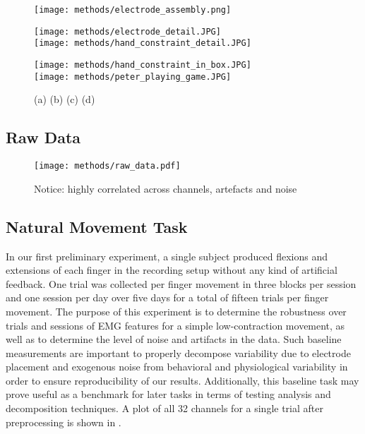 \documentclass[../main.tex]{subfiles}
\begin{document}
\begin{figure}
  \centering
  \begin{minipage}{0.33\textwidth}
    \texttt{[image: methods/electrode\_assembly.png]}
    \subcaption{}
  \end{minipage}%
  \hspace*{5pt}
  \begin{minipage}{0.33\textwidth}
    \texttt{[image: methods/electrode\_detail.JPG]}\\
    \subcaption{}
    \texttt{[image: methods/hand\_constraint\_detail.JPG]}
    \subcaption{}
  \end{minipage}%
  \hspace*{5pt}
  \begin{minipage}{0.33\textwidth}
    \texttt{[image: methods/hand\_constraint\_in\_box.JPG]}\\
    \subcaption{}
    \texttt{[image: methods/peter\_playing\_game.JPG]}
    \subcaption{}
  \end{minipage}
  \caption{(a)  (b)  (c)  (d)}
\end{figure}


\subsection{Raw Data}

\begin{figure}
  \label{fig:raw_data}
  \centering
  \texttt{[image: methods/raw\_data.pdf]}
  \caption{Notice: highly correlated across channels, artefacts and noise}\label{fig:raw_data}
  \end{figure}


% 

\subsection{Natural Movement Task}

In our first preliminary experiment, a single subject produced flexions and extensions of each finger in the recording setup without any kind of artificial feedback. One trial was collected per finger movement in three blocks per session and one session per day over five days for a total of fifteen trials per finger movement. The purpose of this experiment is to determine the robustness over trials and sessions of EMG features for a simple low-contraction movement, as well as to determine the level of noise and artifacts in the data. Such baseline measurements are important to properly decompose variability due to electrode placement and exogenous noise from behavioral and physiological variability in order to ensure reproducibility of our results. Additionally, this baseline task may prove useful as a benchmark for later tasks in terms of testing analysis and decomposition techniques. A plot of all 32 channels for a single trial after preprocessing is shown in .
\end{document}

